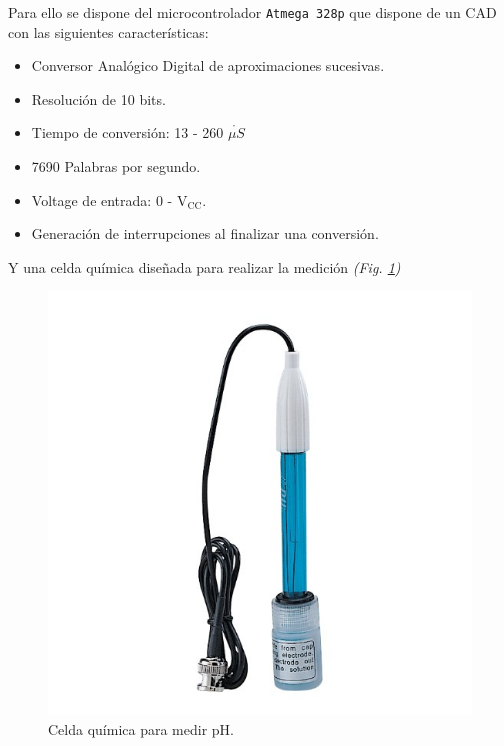 \documentclass[10pt,a4paper]{article}
\begin{document}
Para ello se dispone del microcontrolador \texttt{Atmega 328p} que dispone de un CAD con las siguientes características:

\begin{itemize}
	\item{Conversor Analógico Digital de aproximaciones sucesivas.}
	\item {Resolución de 10 bits.}
	\item {Tiempo de conversión: 13 - 260 $\mathring{\mu S}$}
	\item {7690 Palabras por segundo.}
	\item{Voltage de entrada: 0 - $\mathrm{V_{CC}}$.}
	\item{Generación de interrupciones al finalizar una conversión.}
\end{itemize}

Y una celda química diseñada para realizar la medición \emph{(Fig. \ref{fig3})}

\begin{figure}[h!]
	\begin{center}
		\includegraphics[scale=1.5]{celda-quimica.jpg}
	\end{center}
	\caption{Celda química para medir pH.}
	\label{fig3}
\end{figure}
\end{document}
